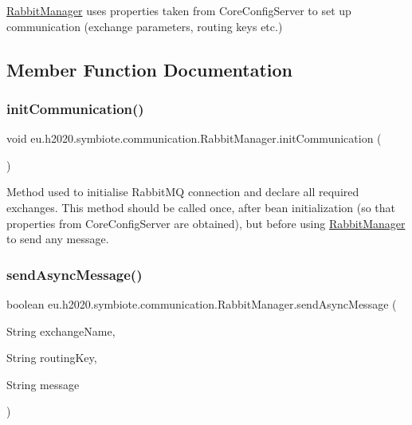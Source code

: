 \hyperlink{classeu_1_1h2020_1_1symbiote_1_1communication_1_1RabbitManager}{Rabbit\+Manager} uses properties taken from Core\+Config\+Server to set up communication (exchange parameters, routing keys etc.) 

\subsection{Member Function Documentation}
\mbox{\label{classeu_1_1h2020_1_1symbiote_1_1communication_1_1RabbitManager_a30abf6a670122eb22a8105a206858616}} 
\subsubsection{\texorpdfstring{init\+Communication()}{initCommunication()}}
{\footnotesize\ttfamily void eu.\+h2020.\+symbiote.\+communication.\+Rabbit\+Manager.\+init\+Communication (\begin{DoxyParamCaption}{ }\end{DoxyParamCaption})}

Method used to initialise Rabbit\+MQ connection and declare all required exchanges. This method should be called once, after bean initialization (so that properties from Core\+Config\+Server are obtained), but before using \hyperlink{classeu_1_1h2020_1_1symbiote_1_1communication_1_1RabbitManager}{Rabbit\+Manager} to send any message. \mbox{\label{classeu_1_1h2020_1_1symbiote_1_1communication_1_1RabbitManager_aaf8fea1645c8e35ed2a1d8f8e2b4356f}} 
\subsubsection{\texorpdfstring{send\+Async\+Message()}{sendAsyncMessage()}}
{\footnotesize\ttfamily boolean eu.\+h2020.\+symbiote.\+communication.\+Rabbit\+Manager.\+send\+Async\+Message (\begin{DoxyParamCaption}\item[{String}]{exchange\+Name,  }\item[{String}]{routing\+Key,  }\item[{String}]{message }\end{DoxyParamCaption})}


